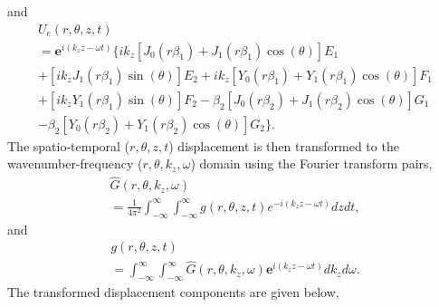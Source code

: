 \documentclass[10pt]{asme2ej}
\begin{document}
and
\begin{multline}
    U_e(r,\theta,z,t)\\ = \mathbf{e}^{i(k_{z}z-\omega t)}\bigg\{ik_z[J_{0}(r\beta_1) + J_{1}(r\beta_1)\cos(\theta)]E_1\\ + [ik_zJ_{1}(r\beta_1)\sin(\theta)]E_2 +  ik_z[Y_{0}(r\beta_1) + Y_{1}(r\beta_1)\cos(\theta)]F_1\\ +[ik_zY_{1}(r\beta_1)\sin(\theta)]F_2 
    - \beta_2[J_{0}(r\beta_2) + J_{1}(r\beta_2)\cos(\theta)]G_1\\ - \beta_2[Y_{0}(r\beta_2) + Y_{1}(r\beta_2)\cos(\theta)]G_2\bigg\}.
\end{multline}
The spatio-temporal ($r, \theta, z, t$) displacement is then transformed to the wavenumber-frequency ($r, \theta, k_z, \omega$) domain using the Fourier transform pairs,
\begin{multline}\label{Forward fourier transform}
    \hat{G}(r,\theta,k_{z},\omega)\\ = \frac{1}{4\pi^{2}}\int^{\infty}_{-\infty}\int^{\infty}_{-\infty}g(r,\theta,z,t)e^{-i(k_{z}z-\omega t)}dzdt,
\end{multline}
and
\begin{multline}\label{Backward fourier transform}
    g(r,\theta,z,t)\\ = \int^{\infty}_{-\infty}\int^{\infty}_{-\infty}\hat{G}(r,\theta,k_{z},\omega)\mathbf{e}^{i(k_{z}z-\omega t)}dk_{z}d\omega.
\end{multline} 
The transformed displacement components are given below,
\end{document}
